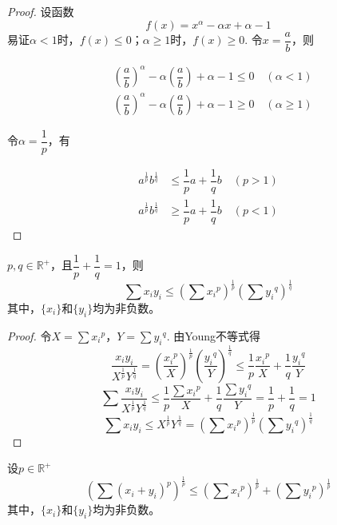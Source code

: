 \begin{proof}

    设函数
    $$f(x) = x^{\alpha} - \alpha x + \alpha - 1$$
    易证$\alpha < 1 $时，$f(x) \leq 0$；$\alpha \geq 1$时，$f(x) \geq 0$.
    令$x=\dfrac{a}{b}$，则
    
    \begin{align*}
        &(\dfrac{a}{b})^{\alpha} - \alpha (\dfrac{a}{b}) + \alpha - 1 \leq 0 \quad (\alpha < 1)\\
        &(\dfrac{a}{b})^{\alpha} - \alpha (\dfrac{a}{b}) + \alpha - 1 \geq 0 \quad (\alpha \geq 1)
    \end{align*}

    令$\alpha = \dfrac{1}{p}$，有

    \begin{align*}
        a^{\frac{1}{p}}b^{\frac{1}{q}}&\leq\dfrac{1}{p}a+\dfrac{1}{q}b\quad(p>1)\\
        a^{\frac{1}{p}}b^{\frac{1}{q}}&\geq\dfrac{1}{p}a+\dfrac{1}{q}b\quad(p<1)
    \end{align*}

\end{proof}

\begin{theorem}[H{\H o}lder不等式]
    
    $p,q\in\mathbb{R}^+$，且$\dfrac{1}{p}+\dfrac{1}{q}=1$，则
    $$\sum{x_i y_i} \leq \left(\sum{{x_i}^{p}}\right)^{\frac{1}{p}} \left(\sum{{y_i}^{q}}\right)^{\frac{1}{q}}$$
    其中，$\{x_i\}$和$\{y_i\}$均为非负数。

\end{theorem}

\begin{proof}

    令$X=\sum{{x_i}^p}$，$Y=\sum{{y_i}^q}$.
    由\textup{Young}不等式得
    $$\dfrac{x_i y_i}{X^{\frac{1}{p}}Y^{\frac{1}{q}}}=\left(\dfrac{{x_i}^p}{X}\right)^{\frac{1}{p}}\left(\dfrac{{y_i}^q}{Y}\right)^{\frac{1}{q}}\leq \dfrac{1}{p}\dfrac{{x_i}^p}{X} + \dfrac{1}{q}\dfrac{{y_i}^q}{Y}$$
    $$\sum{\dfrac{x_i y_i}{X^{\frac{1}{p}}Y^{\frac{1}{q}}}} \leq \dfrac{1}{p}\dfrac{\sum{{x_i}^p}}{X} + \dfrac{1}{q}\dfrac{\sum{{y_i}^q}}{Y} = \dfrac{1}{p}+\dfrac{1}{q}=1 $$
    $$\sum{x_i y_i} \leq X^{\frac{1}{p}} Y^{\frac{1}{q}} = (\sum{{x_i}^{p}})^{\frac{1}{p}} (\sum{{y_i}^{q}})^{\frac{1}{q}}$$

\end{proof}

\begin{theorem}[Minkowski不等式]

    设$p\in\mathbb{R}^+$
    $$\left( \sum{(x_i + y_i)}^p \right) ^{\frac{1}{p}} \leq \left(\sum{{x_i}^p}\right)^{\frac{1}{p}} + \left(\sum{{y_i}^{p}}\right)^{\frac{1}{p}}$$
    其中，$\{x_i\}$和$\{y_i\}$均为非负数。

\end{theorem}

